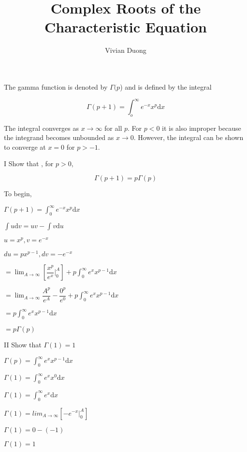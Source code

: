 \documentclass{article}
\title{Complex Roots of the Characteristic Equation}
\author{Vivian Duong}
\date{}
\begin{document}
The gamma function is denoted by $\Gamma(p$) and is defined by the integral

\begin{equation}
\Gamma(p+1) = \int_o^\infty e^{-x}x^p\mathrm{d}x
\end{equation}

The integral converges as $x \rightarrow \infty$ for all $p$. For $p < 0$ it is also improper because the integrand becomes unbounded as $x \rightarrow 0$. However, the integral can be shown to converge at $x=0$ for $p>-1$.

I Show that , for $p>0$,

\begin{equation}\label{eqref:1}
\Gamma(p+1) = p\Gamma(p)
\end{equation}

To begin,
\begin{center}
$\Gamma(p+1) = \int_0^\infty e^{-x}x^p\mathrm{d}x$
\end{center}

\begin{flushright}
$\int u \mathrm{d}v = uv - \int v \mathrm{d}u$

$u = x^p, v = e^{-x}$

$du = px^{p-1}, dv = -e^{-x}$
\end{flushright}

\begin{center}
$ = \lim_{A \rightarrow \infty} [\dfrac{x^p}{e^x}|_0^A] + p \int_0^\infty e^xx^{p-1} \mathrm{d}x$

$ = \lim_{A \rightarrow \infty} \dfrac{A^p}{e^A} - \dfrac{0^p}{e^0} + p \int_0^\infty e^xx^{p-1} \mathrm{d}x$

$ =  p \int_0^\infty e^xx^{p-1} \mathrm{d}x$

$ = p\Gamma (p)$
\end{center}

II Show that $\Gamma(1) = 1$
\begin{center}
$\Gamma(p) = \int_0^\infty e^xx^{p-1} \mathrm{d}x$

$\Gamma(1) = \int_0^\infty e^xx^{0} \mathrm{d}x$

$\Gamma(1) = \int_0^\infty e^x \mathrm{d}x$

$\Gamma(1) = lim_{A \rightarrow \infty} [-e^{-x}|_0^A]$

$\Gamma(1) = 0 -(-1)$

$\Gamma(1) = 1$
\end{center}
\end{document}
